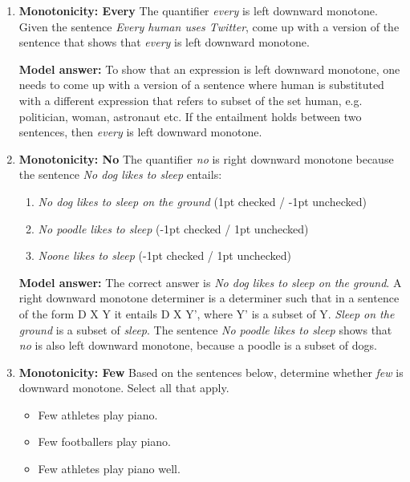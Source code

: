\documentclass[a4,11pt]{article}
\begin{document}
\begin{enumerate}[leftmargin = 12pt]
{\bf Model answer:} The correct answers are (a), (b), (c). (a) and (c) correspond to the above given sentences. (b) is true because A is a subset of B and B is a subset of C, therefore A is a subset of C.

\item {\bf Monotonicity: Every} The quantifier \textit{every} is left downward monotone. Given the sentence \textit{Every human uses Twitter}, come up with a version of the sentence that shows that  \textit{every} is left downward monotone.
	
{\bf Model answer:} To show that an expression is left downward monotone, one needs to come up with a version of a sentence where human is substituted with a different expression that refers to subset of the set human, e.g. politician, woman, astronaut etc. If the entailment holds between two sentences, then  \textit{every} is left downward monotone.


\item {\bf Monotonicity: No} The quantifier \textit{no} is right downward monotone because the sentence \textit{No dog likes to sleep} entails:

      \begin{enumerate}[noitemsep]
        \item \textit{No dog likes to sleep on the ground} (1pt checked / -1pt unchecked)
	\item \textit{No poodle likes to sleep} (-1pt checked / 1pt unchecked)
        \item \textit{Noone likes to sleep} (-1pt checked / 1pt unchecked)
	\end{enumerate}	

{\bf Model answer:}  The correct answer is \textit{No dog likes to sleep on the ground}. A right downward monotone determiner is a determiner such that in a sentence of the form D X Y it entails D X Y', where Y' is a subset of Y. \textit{Sleep on the ground} is a subset of \textit{sleep}. The sentence \textit{No poodle likes to sleep} shows that \textit{no} is also left downward monotone, because a poodle is a subset of dogs.

\item {\bf Monotonicity: Few} Based on the sentences below, determine whether \textit{few} is downward monotone. Select all that apply. 

\begin{itemize}[noitemsep]
\item Few athletes play piano.
\item Few footballers play piano.
\item Few athletes play piano well.
\end{itemize}


\end{enumerate}
\end{document}
